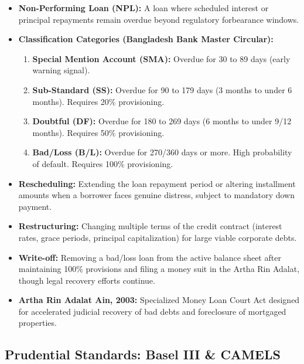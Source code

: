 \begin{itemize}
  \item \textbf{Non-Performing Loan (NPL):} A loan where scheduled interest or principal repayments remain overdue beyond regulatory forbearance windows.
  \item \textbf{Classification Categories (Bangladesh Bank Master Circular):}
  \begin{enumerate}
    \item \textbf{Special Mention Account (SMA):} Overdue for 30 to 89 days (early warning signal).
    \item \textbf{Sub-Standard (SS):} Overdue for 90 to 179 days (3 months to under 6 months). Requires 20\% provisioning.
    \item \textbf{Doubtful (DF):} Overdue for 180 to 269 days (6 months to under 9/12 months). Requires 50\% provisioning.
    \item \textbf{Bad/Loss (B/L):} Overdue for 270/360 days or more. High probability of default. Requires 100\% provisioning.
  \end{enumerate}
  \item \textbf{Rescheduling:} Extending the loan repayment period or altering installment amounts when a borrower faces genuine distress, subject to mandatory down payment.
  \item \textbf{Restructuring:} Changing multiple terms of the credit contract (interest rates, grace periods, principal capitalization) for large viable corporate debts.
  \item \textbf{Write-off:} Removing a bad/loss loan from the active balance sheet after maintaining 100\% provisions and filing a money suit in the Artha Rin Adalat, though legal recovery efforts continue.
  \item \textbf{Artha Rin Adalat Ain, 2003:} Specialized Money Loan Court Act designed for accelerated judicial recovery of bad debts and foreclosure of mortgaged properties.
\end{itemize}

\medskip

\subsection{Prudential Standards: Basel III \& CAMELS}

